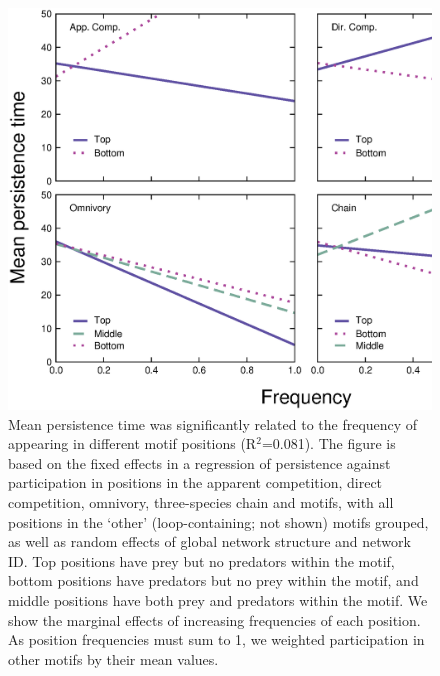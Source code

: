 \documentclass[12pt]{article}
\begin{document}
    \begin{figure}[ht!]
        \centering
        \includegraphics[width=\textwidth]{figures/roles/persistence_vs_positions_freq.eps}
        \caption{Mean persistence time was significantly related to the frequency of appearing in different motif positions (R$^2$=0.081). The figure is based on the fixed effects in a regression of persistence against participation in positions in the apparent competition, direct competition, omnivory, three-species chain and motifs, with all positions in the `other' (loop-containing; not shown) motifs grouped, as well as random effects of global network structure and network ID. Top positions have prey but no predators within the motif, bottom positions have predators but no prey within the motif, and middle positions have both prey and predators within the motif. We show the marginal effects of increasing frequencies of each position. As position frequencies must sum to 1, we weighted participation in other motifs by their mean values.}
        \label{fig:persistence_positions}
    \end{figure}

    \clearpage
\end{document}
